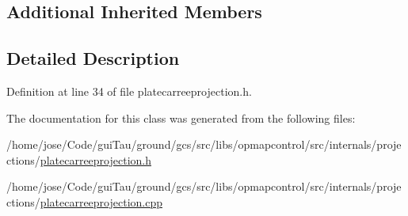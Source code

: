 \subsection*{Additional Inherited Members}


\subsection{Detailed Description}


Definition at line 34 of file platecarreeprojection.\-h.



The documentation for this class was generated from the following files\-:\begin{DoxyCompactItemize}
\item 
/home/jose/\-Code/gui\-Tau/ground/gcs/src/libs/opmapcontrol/src/internals/projections/\hyperlink{platecarreeprojection_8h}{platecarreeprojection.\-h}\item 
/home/jose/\-Code/gui\-Tau/ground/gcs/src/libs/opmapcontrol/src/internals/projections/\hyperlink{platecarreeprojection_8cpp}{platecarreeprojection.\-cpp}\end{DoxyCompactItemize}
